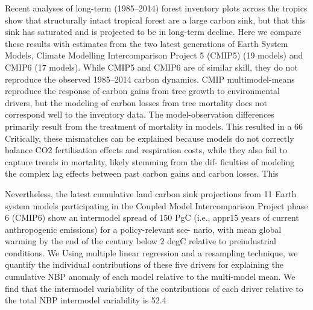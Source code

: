 \documentclass{article}
\begin{document}
\citep{Koch2021}
Recent analyses of long-term (1985–2014) forest inventory plots across the tropics show that structurally intact tropical forest are a large carbon sink, but that this sink has saturated and is projected to be in long-term decline. Here we compare these results with estimates from the two latest generations of Earth System Models, Climate Modelling Intercomparison Project 5 (CMIP5) (19 models) and CMIP6 (17 models). While CMIP5 and CMIP6 are of similar skill, they do not reproduce the observed 1985–2014 carbon dynamics. CMIP multimodel-means reproduce the response of carbon gains from tree growth to environmental drivers, but the modeling of carbon losses from tree mortality does not correspond well to the inventory data. The model-observation differences primarily result from the treatment of mortality in models.
This resulted in a 66%
Critically, these mismatches can be explained because models do not correctly balance CO2 fertilisation effects and respiration costs, while they also fail to capture trends in mortality, likely stemming from the dif- ficulties of modeling the complex lag effects between past carbon gains and carbon losses. This

\citep{Padron2022}
Nevertheless, the latest cumulative land carbon sink projections from 11 Earth system models participating in the Coupled Model Intercomparison Project phase 6 (CMIP6) show an intermodel spread of 150 PgC (i.e., appr15 years of current anthropogenic emissions) for a policy-relevant sce- nario, with mean global warming by the end of the century below 2 degC relative to preindustrial conditions. We
Using multiple linear regression and a resampling technique, we quantify the individual contributions of these five drivers for explaining the cumulative NBP anomaly of each model relative to the multi-model mean. We find that the intermodel variability of the contributions of each driver relative to the total NBP intermodel variability is 52.4%
\end{document}
